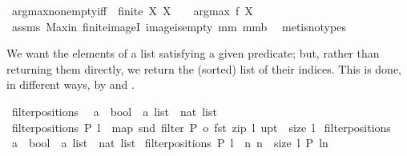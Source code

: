 \begin{isabellebody}
\isamarkuptrue%
\isamarkupfalse%
\ argmax{\isacharunderscore}non{\isacharunderscore}empty{\isacharunderscore}iff{\isacharcolon}\ \ {\isachardoublequoteopen}finite\ X{\isachardoublequoteclose}\ {\isachardoublequoteopen}X\ {\isasymnoteq}\ {\isacharbraceleft}{\isacharbraceright}{\isachardoublequoteclose}\ \ {\isachardoublequoteopen}argmax\ f\ X\ {\isasymnoteq}{\isacharbraceleft}{\isacharbraceright}{\isachardoublequoteclose}\isanewline
%
\isadelimproof
%
\endisadelimproof
%
\isatagproof
{}\isamarkupfalse%
\ assms\ Max{\isacharunderscore}in\ finite{\isacharunderscore}imageI\ image{\isacharunderscore}is{\isacharunderscore}empty\ mm{}{}\ mm{}{}b\ \isamarkupfalse%
\ {\isacharparenleft}metis{\isacharparenleft}no{\isacharunderscore}types{\isacharparenright}{\isacharparenright}%
\endisatagproof
{\isafoldproof}%
%
\isadelimproof
%
\endisadelimproof
%
\begin{isamarkuptext}%
We want the elements of a list satisfying a given predicate;
but, rather than returning them directly, we return the (sorted) list of their indices. 
This is done, in different ways, by  and .%
\end{isamarkuptext}%
\isamarkuptrue%
\isamarkupfalse%
\ filterpositions\ \isanewline
\isanewline
{\isacharcolon}{\isacharcolon}\ {\isachardoublequoteopen}{\isacharparenleft}{\isacharprime}a\ {\isacharequal}{\isachargreater}\ bool{\isacharparenright}\ {\isacharequal}{\isachargreater}\ {\isacharprime}a\ list\ {\isacharequal}{\isachargreater}\ nat\ list{\isachardoublequoteclose}\isanewline
{}\ {\isachardoublequoteopen}filterpositions\ P\ l\ {\isacharequal}\ map\ snd\ {\isacharparenleft}filter\ {\isacharparenleft}P\ o\ fst{\isacharparenright}\ {\isacharparenleft}zip\ l\ {\isacharparenleft}upt\ {}\ {\isacharparenleft}size\ l{\isacharparenright}{\isacharparenright}{\isacharparenright}{\isacharparenright}{\isachardoublequoteclose}\isanewline
\isanewline
\isanewline
\isanewline
{}\isamarkupfalse%
\ filterpositions{}\ \isanewline
{\isacharcolon}{\isacharcolon}\ {\isachardoublequoteopen}{\isacharparenleft}{\isacharprime}a\ {\isacharequal}{\isachargreater}\ bool{\isacharparenright}\ {\isacharequal}{\isachargreater}\ {\isacharprime}a\ list\ {\isacharequal}{\isachargreater}\ nat\ list{\isachardoublequoteclose}\isanewline
{}\ {\isachardoublequoteopen}filterpositions{}\ P\ l\ {\isacharequal}\ {\isacharbrackleft}n{\isachardot}\ n\ {\isasymleftarrow}\ {\isacharbrackleft}{}{\isachardot}{\isachardot}{\isacharless}size\ l{\isacharbrackright}{\isacharcomma}\ P\ {\isacharparenleft}l{\isacharbang}n{\isacharparenright}{\isacharbrackright}{\isachardoublequoteclose}\isanewline

\end{isabellebody}
